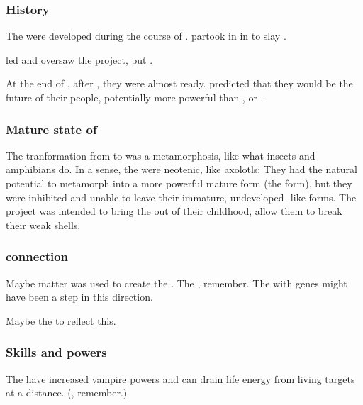 \subsubsection{History}
The \neoresphain{} were developed during the course of {\SentinelsofMithEmph}. 
 partook in  in  to slay \QuessanthIshnaruchaefir. 

 led and oversaw the \neoresphan project, but . 

At the end of {\SentinelsofMithEmph}, after , they were almost ready. 
\Azraid{} predicted that they would be the future of their people, potentially more powerful than \banes, \resphain{} or \satharioth. 






\subsubsection{Mature state of \resphain}
The tranformation from \resphan to \neoresphan was a metamorphosis, like what insects and amphibians do. 
In a sense, the \resphain were neotenic, like axolotls: 
They had the natural potential to metamorph into a more powerful mature form (the \neoresphan form), but they were inhibited and unable to leave their immature, undeveloped \human-like forms. 
The \neoresphan project was intended to bring the \resphain out of their childhood, allow them to break their weak shells.





\subsubsection{\Noggyal connection}
Maybe \noggyal matter was used to create the \neoresphain. 
The \banes {}, remember.
The \neoresphain with \noggyal genes might have been a step in this direction. 

Maybe the \neoresphain {} to reflect this. 




\subsubsection{Skills and powers}
The \neoresphain{} have increased vampire powers and can drain life energy from living targets at a distance. 
(, remember.) 









